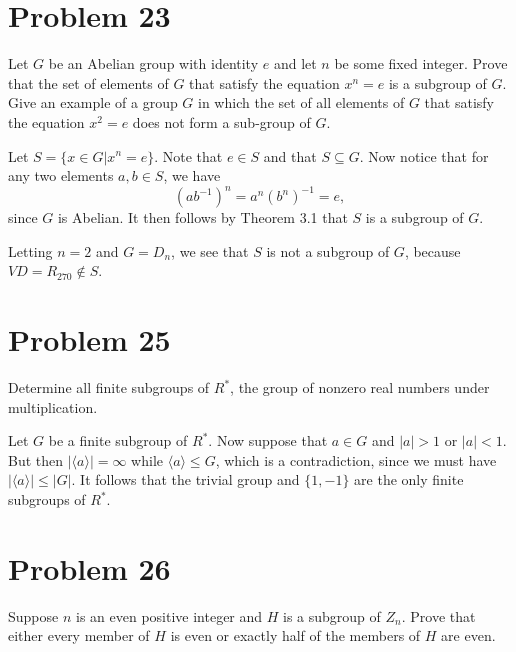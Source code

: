 \documentclass[12pt]{article}
\begin{document}
\section*{Problem 23}

Let $G$ be an Abelian group with identity $e$ and let $n$ be some fixed integer.
Prove that the set of elements of $G$ that satisfy the equation $x^n=e$
is a subgroup of $G$.  Give an example of a group $G$ in which the set
of all elements of $G$ that satisfy the equation $x^2=e$ does not form a sub-group of $G$.

Let $S=\{x\in G|x^n=e\}$.  Note that $e\in S$ and that $S\subseteq G$.
Now notice that for any two elements $a,b\in S$, we have
\begin{equation*}
(ab^{-1})^n = a^n(b^n)^{-1} = e,
\end{equation*}
since $G$ is Abelian.  It then follows by Theorem 3.1 that $S$ is a subgroup of $G$.

Letting $n=2$ and $G=D_n$, we see that $S$ is not a subgroup of $G$,
because $VD=R_{270}\not\in S$.

\section*{Problem 25}

Determine all finite subgroups of $R^*$, the group of nonzero real numbers under multiplication.

Let $G$ be a finite subgroup of $R^*$.  Now suppose that $a\in G$ and $|a|>1$ or $|a|<1$.
But then $|\langle a\rangle|=\infty$ while $\langle a\rangle\leq G$, which is a contradiction,
since we must have $|\langle a\rangle|\leq|G|$.
It follows that the trivial group and $\{1,-1\}$ are the only finite subgroups of $R^*$.

\section*{Problem 26}

Suppose $n$ is an even positive integer and $H$ is a subgroup of $Z_n$.  Prove
that either every member of $H$ is even or exactly half of the members of $H$ are even.
\end{document}
